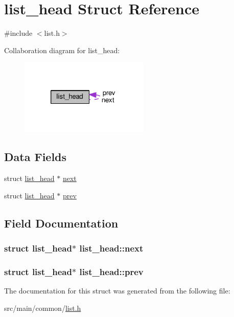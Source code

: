 \hypertarget{structlist__head}{\section{list\+\_\+head Struct Reference}
\label{structlist__head}
}


{\ttfamily \#include $<$list.\+h$>$}



Collaboration diagram for list\+\_\+head\+:\nopagebreak
\begin{figure}[H]
\begin{center}
\leavevmode
\includegraphics[width=175pt]{structlist__head__coll__graph}
\end{center}
\end{figure}
\subsection*{Data Fields}
\begin{DoxyCompactItemize}
\item 
struct \hyperlink{structlist__head}{list\+\_\+head} $\ast$ \hyperlink{structlist__head_ac3b0ff0dfb978a0cfbdad6b9d19cdcfe}{next}
\item 
struct \hyperlink{structlist__head}{list\+\_\+head} $\ast$ \hyperlink{structlist__head_ae4298f7975979e5f6bb406c40c1fa443}{prev}
\end{DoxyCompactItemize}


\subsection{Field Documentation}
\hypertarget{structlist__head_ac3b0ff0dfb978a0cfbdad6b9d19cdcfe}{
\subsubsection[{next}]{\setlength{\rightskip}{0pt plus 5cm}struct {\bf list\+\_\+head}$\ast$ list\+\_\+head\+::next}}\label{structlist__head_ac3b0ff0dfb978a0cfbdad6b9d19cdcfe}
\hypertarget{structlist__head_ae4298f7975979e5f6bb406c40c1fa443}{
\subsubsection[{prev}]{\setlength{\rightskip}{0pt plus 5cm}struct {\bf list\+\_\+head}$\ast$ list\+\_\+head\+::prev}}\label{structlist__head_ae4298f7975979e5f6bb406c40c1fa443}


The documentation for this struct was generated from the following file\+:\begin{DoxyCompactItemize}
\item 
src/main/common/\hyperlink{list_8h}{list.\+h}\end{DoxyCompactItemize}
